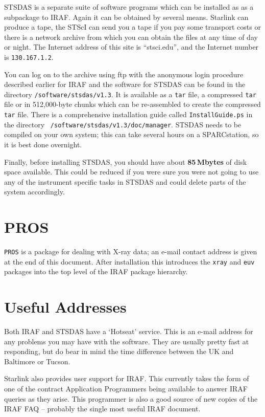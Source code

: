 STSDAS is a separate suite of software programs which can be installed
as as a subpackage to IRAF. Again it can be obtained by several
means. Starlink can produce a tape, the STScI
can send you a tape if you pay some transport costs or
there is a network archive from which you can obtain the files at any
time of day or night. The Internet address of this site is
``stsci.edu'', and the Internet number is {\tt 130.167.1.2}.

You can
log on to the archive using ftp with the anonymous login procedure
described earlier for IRAF and the software for STSDAS can be found in
the directory {\tt /software/stsdas/v1.3}. It is available as a {\tt tar}
file, a compressed {\tt tar} file or in 512,000-byte chunks which can be
re-assembled to create the compressed {\tt tar} file. There is a comprehensive
installation guide called {\tt InstallGuide.ps} in the directory {\tt
/software/stsdas/v1.3/doc/manager}. STSDAS needs to be compiled on
your own system; this can take several hours on a SPARCstation, so it
is best done overnight.

Finally, before installing STSDAS, you should have about {\bf
85\,Mbytes} of disk space available.
This could be reduced if you were sure you were
not going to use any of the instrument specific tasks in STSDAS and
could delete parts of the system accordingly.

\section{PROS}

{\tt PROS} is a package for dealing with X-ray data; an e-mail contact
address is given at the end of this document. After installation this
introduces the {\tt xray} and {\tt euv} packages into the top level of the
IRAF package hierarchy.

\section{Useful Addresses}

Both IRAF and STSDAS have a `Hotseat' service. This is an e-mail
address for any problems you may have with the software. They are
usually pretty fast at responding, but do bear in mind the time
difference between the UK and Baltimore or Tucson.

Starlink also provides user support for IRAF. This currently
takes the form of one of the contract Application Programmers being
available to answer IRAF queries as they arise. This
programmer is also a good
source of new copies of the IRAF FAQ -- probably the single most useful
IRAF document.

